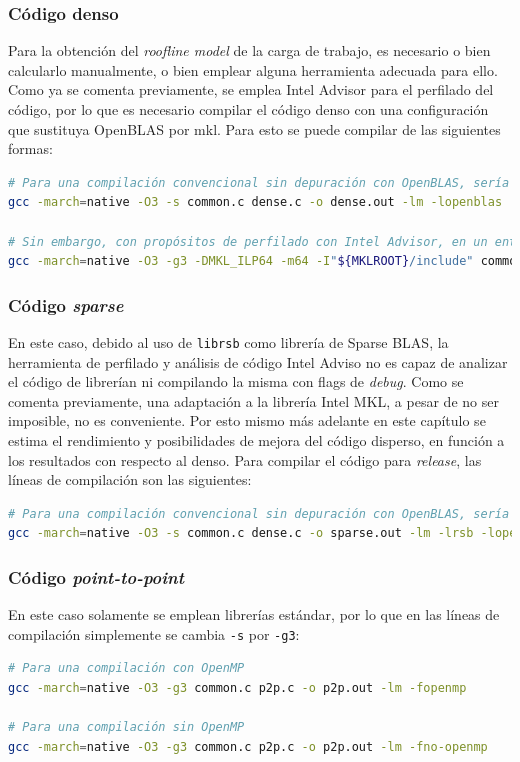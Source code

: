 \subsubsection{Código denso}
Para la obtención del \textit{roofline model} de la carga de trabajo, es necesario o bien calcularlo manualmente, o bien emplear alguna herramienta adecuada para ello. Como ya se comenta previamente, se emplea Intel Advisor para el perfilado del código, por lo que es necesario compilar el código denso con una configuración que sustituya OpenBLAS por \acrshort{mkl}. Para esto se puede compilar de las siguientes formas:\medskip
\begin{lstlisting}[language=bash]
# Para una compilación convencional sin depuración con OpenBLAS, sería necesario únicamente ejecutar
gcc -march=native -O3 -s common.c dense.c -o dense.out -lm -lopenblas

# Sin embargo, con propósitos de perfilado con Intel Advisor, en un entorno bash donde se haya realizado `source /opt/intel/oneapi/setvar.sh` se ha de compilar con:
gcc -march=native -O3 -g3 -DMKL_ILP64 -m64 -I"${MKLROOT}/include" common.c dense.c -o dense.out -L${MKLROOT}/lib/intel64 -Wl,--no-as-needed -lmkl_intel_ilp64 -lmkl_gnu_thread -lmkl_core -lgomp -lpthread -lm -ldl
\end{lstlisting}

\subsubsection{Código \textit{sparse}}
En este caso, debido al uso de \texttt{librsb} como librería de Sparse BLAS, la herramienta de perfilado y análisis de código Intel Adviso no es capaz de analizar el código de librerían ni compilando la misma con flags de \textit{debug}. Como se comenta previamente, una adaptación a la librería Intel MKL, a pesar de no ser imposible, no es conveniente. Por esto mismo más adelante en este capítulo se estima el rendimiento y posibilidades de mejora del código disperso, en función a los resultados con respecto al denso. Para compilar el código para \textit{release}, las líneas de compilación son las siguientes:\medskip
\begin{lstlisting}[language=bash]
# Para una compilación convencional sin depuración con OpenBLAS, sería necesario únicamente ejecutar
gcc -march=native -O3 -s common.c dense.c -o sparse.out -lm -lrsb -lopenblas
\end{lstlisting}

\subsubsection{Código \textit{point-to-point}}
En este caso solamente se emplean librerías estándar, por lo que en las líneas de compilación simplemente se cambia \texttt{-s} por \texttt{-g3}:\medskip
\begin{lstlisting}[language=bash]
# Para una compilación con OpenMP
gcc -march=native -O3 -g3 common.c p2p.c -o p2p.out -lm -fopenmp

# Para una compilación sin OpenMP
gcc -march=native -O3 -g3 common.c p2p.c -o p2p.out -lm -fno-openmp
\end{lstlisting}

